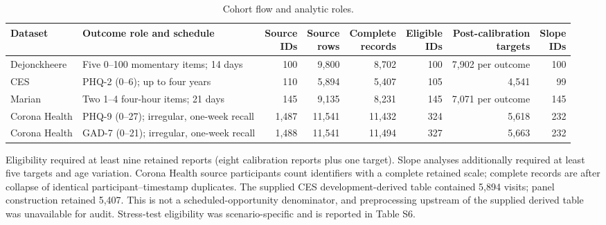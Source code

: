 \documentclass[pdflatex,sn-vancouver-num]{sn-jnl}
\begin{document}
\begin{table}[!htbp]
\caption{Cohort flow and analytic roles.}\label{tab:s1}
\centering\scriptsize
\setlength{\tabcolsep}{3pt}
\begin{tabularx}{\textwidth}{@{}l>{\raggedright\arraybackslash}Xrrrrrr@{}}
\toprule
Dataset & Outcome role and schedule & \shortstack{Source\\IDs} & \shortstack{Source\\rows} & \shortstack{Complete\\records} & \shortstack{Eligible\\IDs} & \shortstack{Post-calibration\\targets} & \shortstack{Slope\\IDs}\\
\midrule
Dejonckheere & Five 0--100 momentary items; 14 days & 100 & 9,800 & 8,702 & 100 & 7,902 per outcome & 100\\
CES & PHQ-2 (0--6); up to four years & 110 & 5,894 & 5,407 & 105 & 4,541 & 99\\
Marian & Two 1--4 four-hour items; 21 days & 145 & 9,135 & 8,231 & 145 & 7,071 per outcome & 145\\
Corona Health & PHQ-9 (0--27); irregular, one-week recall & 1,487 & 11,541 & 11,432 & 324 & 5,618 & 232\\
Corona Health & GAD-7 (0--21); irregular, one-week recall & 1,488 & 11,541 & 11,494 & 327 & 5,663 & 232\\
\bottomrule
\end{tabularx}
\begin{flushleft}\footnotesize Eligibility required at least nine retained reports (eight calibration reports plus one target). Slope analyses additionally required at least five targets and age variation. Corona Health source participants count identifiers with a complete retained scale; complete records are after collapse of identical participant--timestamp duplicates. The supplied CES development-derived table contained 5,894 visits; panel construction retained 5,407. This is not a scheduled-opportunity denominator, and preprocessing upstream of the supplied derived table was unavailable for audit. Stress-test eligibility was scenario-specific and is reported in Table S6.\end{flushleft}
\end{table}
\end{document}
